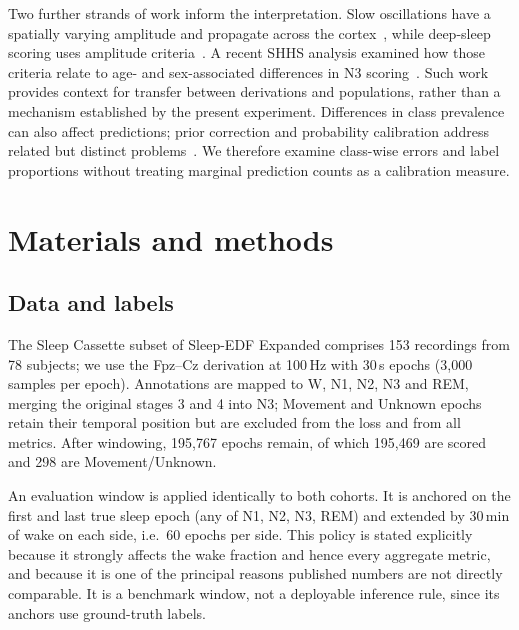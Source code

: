 \documentclass[11pt,a4paper]{article}
\begin{document}
Two further strands of work inform the interpretation. Slow oscillations have a spatially varying
amplitude and propagate across the cortex~\cite{massimini2004travelling}, while deep-sleep scoring uses
amplitude criteria~\cite{rechtschaffen1968,berry2017aasm}. A recent SHHS analysis examined how those
criteria relate to age- and sex-associated differences in N3 scoring~\cite{davidson2025n3}. Such work
provides context for transfer between derivations and populations, rather than a mechanism established
by the present experiment. Differences in class prevalence can also affect predictions; prior correction
and probability calibration address related but distinct problems~\cite{saerens2002adjusting,guo2017calibration}.
We therefore examine class-wise errors and label proportions without treating marginal prediction
counts as a calibration measure.

\section{Materials and methods}

\subsection{Data and labels}

The Sleep Cassette subset of Sleep-EDF Expanded comprises 153 recordings from 78 subjects; we use the
Fpz--Cz derivation at 100\,Hz with 30\,s epochs (3{,}000 samples per epoch). Annotations are mapped to
W, N1, N2, N3 and REM, merging the original stages 3 and 4 into N3; Movement and Unknown epochs retain their temporal position but are excluded from
the loss and from all metrics. After windowing, 195{,}767 epochs remain, of which 195{,}469 are scored
and 298 are Movement/Unknown.

An evaluation window is applied identically to both cohorts. It is anchored on the first and last true
sleep epoch (any of N1, N2, N3, REM) and extended by 30\,min of wake on each side, i.e.\ 60 epochs per
side. This policy is stated explicitly because it strongly affects the wake fraction and hence every
aggregate metric, and because it is one of the principal reasons published numbers are not directly
comparable. It is a benchmark window, not a deployable inference rule, since its anchors use ground-truth
labels.
\end{document}

